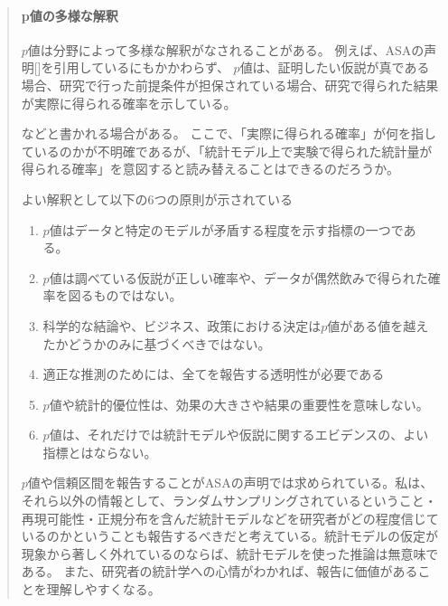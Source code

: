 \documentclass[a4paper,11pt,dvipdfmx]{jsarticle}
\begin{document}
\begin{mybox}
    \begin{quote}
    \paragraph{p値の多様な解釈}
$p$値は分野によって多様な解釈がなされることがある\cite{published_papers/18436201,2020医療統計解析使いこなし実践ガイド}。
例えば、ASAの声明[\cite{ASA_JA}]を引用しているにもかかわらず、
$p$値は、証明したい仮説が真である場合、研究で行った前提条件が担保されている場合、研究で得られた結果が実際に得られる確率を示している\cite{2020医療統計解析使いこなし実践ガイド}。

などと書かれる場合がある。
ここで、「実際に得られる確率」が何を指しているのかが不明確であるが、「統計モデル上で実験で得られた統計量が得られる確率」を意図すると読み替えることはできるのだろうか。
\fi

よい解釈として以下の6つの原則が示されている\cite{published_papers/18436201}
\begin{enumerate}
    \item $p$値はデータと特定のモデルが矛盾する程度を示す指標の一つである。
    \item $p$値は調べている仮説が正しい確率や、データが偶然飲みで得られた確率を図るものではない。
    \item 科学的な結論や、ビジネス、政策における決定は$p$値がある値を越えたかどうかのみに基づくべきではない。
    \item 適正な推測のためには、全てを報告する透明性が必要である
    \item $p$値や統計的優位性は、効果の大きさや結果の重要性を意味しない。
    \item $p$値は、それだけでは統計モデルや仮説に関するエビデンスの、よい指標とはならない。
\end{enumerate}

    $p$値や信頼区間を報告することがASAの声明では求められている。私は、それら以外の情報として、ランダムサンプリングされているということ・再現可能性・正規分布を含んだ統計モデルなどを研究者がどの程度信じているのかということも報告するべきだと考えている。統計モデルの仮定が現象から著しく外れているのならば、統計モデルを使った推論は無意味である。
    また、研究者の統計学への心情がわかれば、報告に価値があることを理解しやすくなる。


\end{quote}
\end{mybox}
\end{document}
